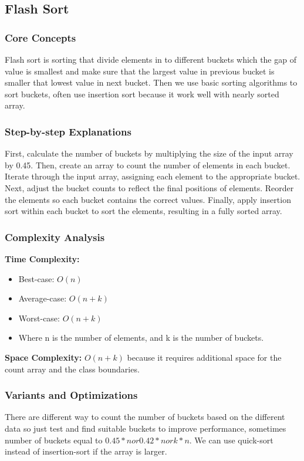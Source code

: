 \subsection{Flash Sort}

\subsubsection{Core Concepts}
Flash sort is sorting that divide elements in to different buckets which the gap of value is smallest and make sure that the largest value in previous bucket is smaller that lowest value in next bucket. Then we use basic sorting algorithms to sort buckets, often use insertion sort because it work well with nearly sorted array. ~\cite{ref4}

\subsubsection{Step-by-step Explanations}
First, calculate the number of buckets by multiplying the size of the input array by 0.45. Then, create an array to count the number of elements in each bucket. Iterate through the input array, assigning each element to the appropriate bucket. Next, adjust the bucket counts to reflect the final positions of elements. Reorder the elements so each bucket contains the correct values. Finally, apply insertion sort within each bucket to sort the elements, resulting in a fully sorted array.

\subsubsection{Complexity Analysis}
\textbf{Time Complexity:}
\begin{itemize}
    \item Best-case: $O(n)$
    \item Average-case: $O(n + k)$
    \item Worst-case: $O(n + k)$
    \item Where n is the number of elements, and k is the number of buckets.
\end{itemize}

\textbf{Space Complexity:} $O(n + k)$ because it requires additional space for the count array and the class boundaries.

\subsubsection{Variants and Optimizations}
There are different way to count the number of buckets based on the different data so just test and find suitable buckets to improve performance, sometimes number of buckets equal to $0.45 * n or 0.42 * n or k * n$. We can use quick-sort instead of insertion-sort if the array is larger. 

